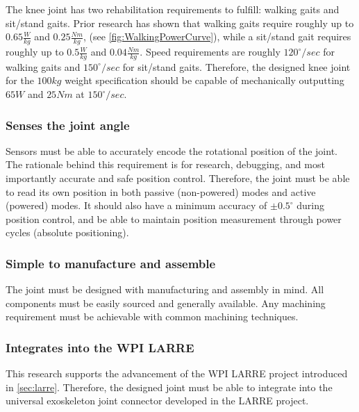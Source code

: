 The knee joint has two rehabilitation requirements to fulfill: walking gaits and sit/stand gaits. Prior research has shown that walking gaits require roughly up to \(0.65 \frac{W}{kg}\) and \(0.25\frac{Nm}{kg}\), (see \autoref{fig:WalkingPowerCurve}), while a sit/stand gait requires roughly up to \(0.5 \frac{W}{kg}\) and \(0.04 \frac{Nm}{kg}\).  Speed requirements are roughly \(120^\circ/sec\) for walking gaits and \(150^\circ/sec\) for sit/stand gaits. Therefore, the designed knee joint for the \(100 kg\) weight specification should be capable of mechanically outputting \(65 W\) and \(25 Nm\) at \(150^\circ/sec\).

\subsubsection{Senses the joint angle}
Sensors must be able to accurately encode the rotational position of the joint. The rationale behind this requirement is for research, debugging, and most importantly accurate and safe position control. Therefore, the joint must be able to read its own position in both passive (non-powered) modes and active (powered) modes. It should also have a minimum accuracy of \(\pm0.5^\circ\) during position control, and be able to maintain position measurement through power cycles (absolute positioning).

\subsubsection{Simple to manufacture and assemble}
The joint must be designed with manufacturing and assembly in mind. All components must be easily sourced and generally available. Any machining requirement must be achievable with common machining techniques.

\subsubsection{Integrates into the WPI LARRE}
This research supports the advancement of the WPI LARRE project introduced in \autoref{sec:larre}. Therefore, the designed joint must be able to integrate into the universal exoskeleton joint connector developed in the LARRE project.